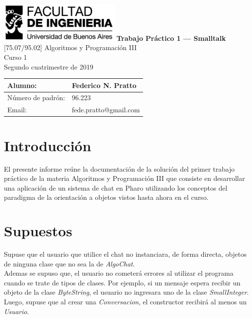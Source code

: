 \documentclass[titlepage,a4paper]{article}
\begin{document}
\begin{titlepage} %
	\hfill\includegraphics[width=6cm]{logofiuba.jpg}
    \centering
    \vfill
    \Huge \textbf{Trabajo Práctico 1 — Smalltalk}
    \vskip2cm
    \Large [75.07/95.02] Algoritmos y Programación III\\
    Curso 1 \\
    Segundo cuatrimestre de 2019 
    \vfill
    \begin{tabular}{ | l | l | } %
      \hline
      Alumno: &  Federico N. Pratto \\ \hline
      Número de padrón: & 96.223 \\ \hline
      Email: & fede.pratto@gmail.com \\ \hline
  	\end{tabular}
    \vfill
    \vfill
\end{titlepage}

\tableofcontents %
\newpage

\section{Introducción}\label{sec:intro}
El presente informe reúne la documentación de la solución del primer trabajo práctico de la materia Algoritmos y Programación III que consiste en desarrollar una aplicación de un sistema de chat en Pharo utilizando los conceptos del paradigma de la orientación a objetos vistos hasta ahora en el curso.

\section{Supuestos}\label{sec:supuestos}

Supuse que el usuario que utilice el chat no instanciara, de forma directa, objetos de ninguna clase que no sea la de \textit{AlgoChat}.\\
Ademas se supuso que, el usuario no cometerá errores al utilizar el programa cuando se trate de tipos de clases. Por ejemplo, si un mensaje espera recibir un objeto de la clase \textit{ByteString}, el usuario no ingresara uno de la clase \textit{SmallInteger}.\\
Luego, supuse que al crear una \textit{Conversacion}, el constructor recibirá al menos un \textit{Usuario}.
\end{document}
